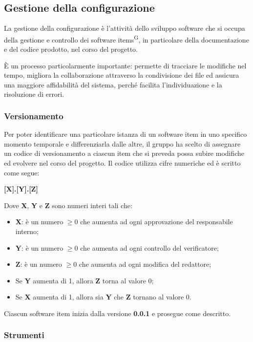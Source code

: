 \subsection{Gestione della configurazione}\label{sec:processi_di_supporto:gestione_configurazione}
La gestione della configurazione è l'attività dello sviluppo software che si occupa della gestione e controllo dei software items\textsuperscript{G}, in particolare della documentazione e del codice prodotto, nel corso del progetto.
\par È un processo particolarmente importante: permette di tracciare le modifiche nel tempo, migliora la collaborazione attraverso la condivisione dei file ed assicura una maggiore affidabilità del sistema, perché facilita l'individuazione e la risoluzione di errori.
\subsubsection{Versionamento}
Per poter identificare una particolare istanza di un software item in uno specifico momento temporale e differenziarla dalle altre, il gruppo ha scelto di assegnare un codice di versionamento a ciascun item che si preveda possa subire modifiche ed evolvere nel corso del progetto. Il codice utilizza cifre numeriche ed è scritto come segue:
\begin{center}
    \textbf{[X].[Y].[Z]}
\end{center}
Dove \textbf{X}, \textbf{Y} e \textbf{Z} sono numeri interi tali che:
\begin{itemize}
    \item \textbf{X}: è un numero $ \geq 0 $ che aumenta ad ogni approvazione del responsabile interno;
    \item \textbf{Y}: è un numero $ \geq 0 $ che aumenta ad ogni controllo del verificatore;
    \item \textbf{Z}: è un numero $ \geq 0 $ che aumenta ad ogni modifica del redattore;
    \item Se \textbf{Y} aumenta di 1, allora \textbf{Z} torna al valore 0;
    \item Se \textbf{X} aumenta di 1, allora sia \textbf{Y} che \textbf{Z} tornano al valore 0.
\end{itemize}
Ciascun software item inizia dalla versione \textbf{0.0.1} e prosegue come descritto.
\subsubsection{Strumenti}
